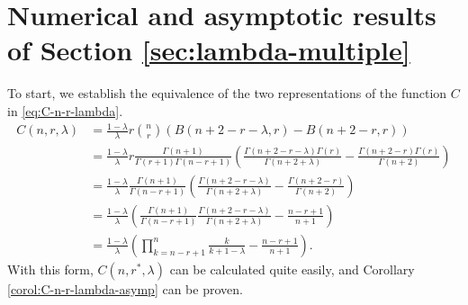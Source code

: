 \documentclass[11pt]{article}
\begin{document}
\section{Numerical and asymptotic results of Section \ref{sec:lambda-multiple}}\label{appendix:lambda-many-samples-asymptotic}
To start, we establish the equivalence of the two representations of the function $C$ in \eqref{eq:C-n-r-lambda}.
\begin{align*}
    C(n,r,\lambda)&=\frac{1-\lambda}{\lambda}r\binom{n}{r}\left(B(n+2-r-\lambda, r)-B(n+2-r, r)\right)\\
    &=\frac{1-\lambda}{\lambda}r\frac{\Gamma(n+1)}{\Gamma(r+1)\Gamma(n-r+1)}\left(\frac{\Gamma(n+2-r-\lambda)\Gamma(r)}{\Gamma(n+2+\lambda)}-\frac{\Gamma(n+2-r)\Gamma(r)}{\Gamma(n+2)}\right)\\
    &=\frac{1-\lambda}{\lambda}\frac{\Gamma(n+1)}{\Gamma(n-r+1)}\left(\frac{\Gamma(n+2-r-\lambda)}{\Gamma(n+2+\lambda)}-\frac{\Gamma(n+2-r)}{\Gamma(n+2)}\right)\\
    &=\frac{1-\lambda}{\lambda}\left(\frac{\Gamma(n+1)}{\Gamma(n-r+1)}\frac{\Gamma(n+2-r-\lambda)}{\Gamma(n+2+\lambda)}-\frac{n-r+1}{n+1}\right)\\
    &=\frac{1-\lambda}{\lambda}\left(\prod_{k=n-r+1}^n\frac{k}{k+1-\lambda}-\frac{n-r+1}{n+1}\right).
\end{align*}
With this form, $C(n,r^*,\lambda)$ can be calculated quite easily, and Corollary \ref{corol:C-n-r-lambda-asymp} can be proven.
\end{document}
